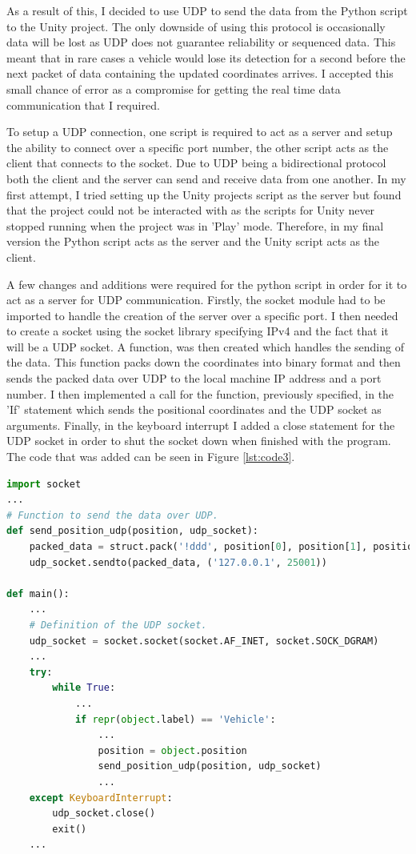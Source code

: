 \documentclass{l4proj}
\begin{document}
As a result of this, I decided to use UDP to send the data from the Python script to the Unity project. The only downside of using this protocol is occasionally data will be lost as UDP does not guarantee reliability or sequenced data. This meant that in rare cases a vehicle would lose its detection for a second before the next packet of data containing the updated coordinates arrives. I accepted this small chance of error as a compromise for getting the real time data communication that I required.

To setup a UDP connection, one script is required to act as a server and setup the ability to connect over a specific port number, the other script acts as the client that connects to the socket. Due to UDP being a bidirectional protocol both the client and the server can send and receive data from one another. In my first attempt, I tried setting up the Unity projects script as the server but found that the project could not be interacted with as the scripts for Unity never stopped running when the project was in 'Play' mode. Therefore, in my final version the Python script acts as the server and the Unity script acts as the client.

A few changes and additions were required for the python script in order for it to act as a server for UDP communication. Firstly, the socket module had to be imported to handle the creation of the server over a specific port. I then needed to create a socket using the socket library specifying IPv4 and the fact that it will be a UDP socket. A function, was then created which handles the sending of the data. This function packs down the coordinates into binary format and then sends the packed data over UDP to the local machine IP address and a port number. I then implemented a call for the function, previously specified, in the 'If' statement which sends the positional coordinates and the UDP socket as arguments. Finally, in the keyboard interrupt I added a close statement for the UDP socket in order to shut the socket down when finished with the program. The code that was added can be seen in Figure \ref{lst:code3}.

\begin{lstlisting}[language=python, float, caption={Python UDP Server Code.}, label={lst:code3}]
import socket
...
# Function to send the data over UDP.
def send_position_udp(position, udp_socket):
    packed_data = struct.pack('!ddd', position[0], position[1], position[2])
    udp_socket.sendto(packed_data, ('127.0.0.1', 25001))

def main():
    ...
    # Definition of the UDP socket.
    udp_socket = socket.socket(socket.AF_INET, socket.SOCK_DGRAM)
    ...
    try:
        while True:
            ...
            if repr(object.label) == 'Vehicle':
                ...
                position = object.position
                send_position_udp(position, udp_socket)
                ...
    except KeyboardInterrupt:
        udp_socket.close()
        exit()
    ...
\end{lstlisting}
\end{document}
